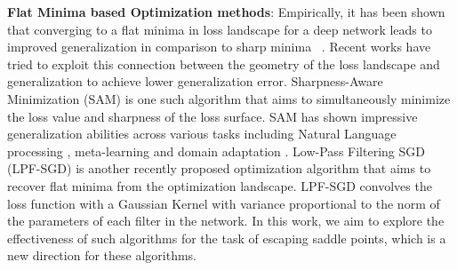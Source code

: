 \documentclass{article}
\begin{document}
\textbf{Flat Minima based Optimization methods}: Empirically, it has been shown that converging to a flat minima in loss landscape for a deep network leads to improved generalization in comparison to sharp minima ~\cite{hochreiter1997flat, keskar2016large}. Recent works have tried to exploit this connection between the geometry of the loss landscape and generalization to achieve lower generalization error. Sharpness-Aware Minimization (SAM) \cite{foret2021sharpnessaware} is one such algorithm that aims to simultaneously minimize the loss value and sharpness of the loss surface. SAM has shown impressive generalization abilities across various tasks including Natural Language processing \cite{bahri2021sharpness}, meta-learning \cite{abbas2022sharp} and domain adaptation \cite{rangwani2022closer}.
Low-Pass Filtering SGD (LPF-SGD) \cite{bisla2022low} is another recently proposed optimization algorithm that aims to recover flat minima from the optimization landscape. LPF-SGD convolves the loss function with a Gaussian Kernel with variance proportional to the norm of the parameters of each filter in the network. In this work, we aim to explore the effectiveness of such algorithms for the task of escaping saddle points, which is a new direction for these algorithms.
\end{document}
